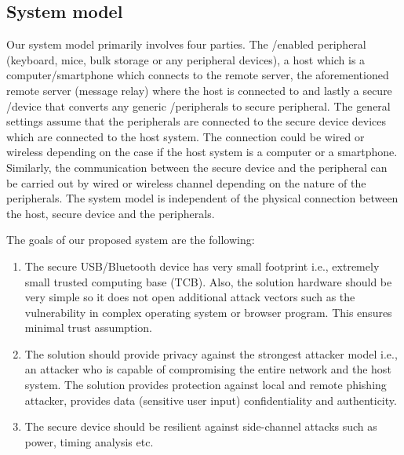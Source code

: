 \subsection{System model} 
\label{sec:secureMessage:systemModel}
Our system model primarily involves four parties. The \usb/\bluetooth enabled peripheral (keyboard, mice, bulk storage or any peripheral devices), a host which is a computer/smartphone which connects to the remote server, the aforementioned remote server (message relay) where the host is connected to and lastly a secure \usb/\bluetooth device that converts any generic \usb/\bluetooth peripherals to secure peripheral. The general settings assume that the peripherals are connected to the secure device devices which are connected to the host system. The connection could be wired or wireless depending on the case if the host system is a computer or a smartphone. Similarly, the communication between the secure device and the peripheral can be carried out by wired or wireless channel depending on the nature of the peripherals. The system model is independent of the physical connection between the host, secure device and the peripherals. 



The goals of our proposed system are the following:
\begin{enumerate}
  \item The secure USB/Bluetooth device has very small footprint i.e., extremely small trusted computing base (TCB). Also, the solution hardware should be very simple so it does not open additional attack vectors such as the vulnerability in complex operating system or browser program. This ensures minimal trust assumption.
  
  \item The solution should provide privacy against the strongest attacker model i.e., an attacker who is capable of compromising the entire network and the host system. The solution provides protection against local and remote phishing attacker, provides data (sensitive user input) confidentiality and authenticity.
 
  \item The secure device should be resilient against side-channel attacks such as power, timing analysis etc. 
  

\end{enumerate}



